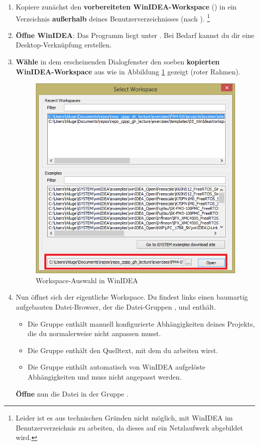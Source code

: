 \begin{enumerate}
\item 
Kopiere zunächst den \textbf{vorbereiteten WinIDEA-Workspace} () in ein Verzeichnis \textbf{außerhalb} deines Benutzerverzeichnisses (\bspw nach ).
\footnote{Leider ist es aus technischen Gründen nicht möglich, mit WinIDEA im Benutzerverzeichnis zu arbeiten, da dieses auf ein Netzlaufwerk abgebildet wird.}

\item 
\textbf{Öffne WinIDEA}:
Das Programm liegt unter .
Bei Bedarf kannst du dir eine Desktop-Verknüpfung erstellen.

\item 
\textbf{Wähle} in dem erscheinenden Dialogfenster den soeben \textbf{kopierten WinIDEA-Workspace} aus wie in Abbildung \ref{fig:WinIdeaSelectWorkspace} gezeigt (roter Rahmen).
\begin{figure}
\begin{centering}
\includegraphics[width=.5\textwidth]{./05_c/figures/WinIDEASelectWorkspace.png}
\caption{Workspace-Auswahl in WinIDEA}
\label{fig:WinIdeaSelectWorkspace}
\end{centering}
\end{figure}

\item 
Nun öffnet sich der eigentliche Workspace.
Du findest links einen baumartig aufgebauten Datei-Browser, der die Datei-Gruppen ,  und  enthält.
\begin{itemize}
\item
Die Gruppe  enthält manuell konfigurierte Abhängigkeiten deines Projekts, die du normalerweise nicht anpassen musst.
\item 
Die Gruppe  enthält den Quelltext, mit dem du arbeiten wirst.
\item 
Die Gruppe  enthält automatisch von WinIDEA aufgelöste Abhängigkeiten und muss nicht angepasst werden.
\end{itemize}
\textbf{Öffne} nun die Datei \textbf{} in der Gruppe .


\end{enumerate}

